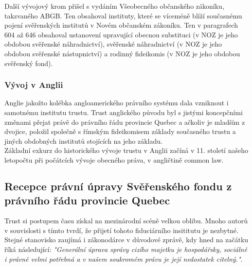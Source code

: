 \documentclass{article}
\begin{document}

Další vývojový krom přišel s vydáním Všeobecného občanského zákoníku, takzvaného ABGB. Ten obsahoval instituty, které se víceméně blíží současnému pojení svěřenských institutů v Novém občanském zákoníku. Ten v paragrafech 604 až 646 obsahoval ustanovení upravující obecnou substituci (v NOZ je jeho obdobou svěřenské náhradnictví), svěřenské náhradnictví (v NOZ je jeho obdobou svěřenské nástupnictví) a rodinný fideikomis (v NOZ je jeho obdobou svěřenský fond).\\



\subsubsection{Vývoj v Anglii}

Anglie jakožto kolébka angloamerického právního systému dala vzniknout i samotnému institutu trustu. Trust anglického původu byl s jistými koncepčními změnami přejat právě do právního řádu provincie Quebec a ačkoliv je mladším z dvojice, položil společně s římským fideikomisem základy současného trustu a jiných obdobných institutů stojících na jeho základu.\\

Základní exkurz do historického vývoje trustu v Anglii začíná v 11. století našeho letopočtu při počátcích vývoje obecného práva, v angličtině common law.

\subsection{Recepce právní úpravy Svěřenského fondu z právního řádu provincie Quebec}

Trust si postupem času získal na mezinárodní scéně velkou oblibu. Mnoho autorů v souvislosti s tímto tvrdí, že přijetí tohoto fiduciárního insititutu je nezbytné. Stejné stanovisko zaujímá i zákonodárce v důvodové zprávě, kdy hned na začátku říká následující: \textit{"Generální úprava správy cizího majetku je hospodářsky, sociálně i právně velmi potřebná a v našem soukromém právu je její nedostatek citelný."}.\\
\end{document}
